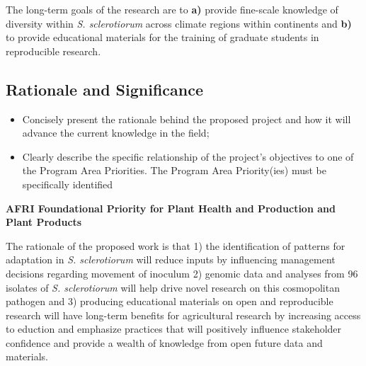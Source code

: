 \documentclass[12pt,letterpaper]{article}
\begin{document}
The long-term goals of the research are to \textbf{a)} provide fine-scale knowledge of diversity within \textit{S. sclerotiorum} across climate regions within continents and \textbf{b)} to provide educational materials for the training of graduate students in reproducible research. 

\subsection{Rationale and Significance}


\begin{itemize}
  \item Concisely present the rationale behind the proposed project and how it will
  advance the current knowledge in the field;

  \item Clearly describe the specific relationship of the project's objectives to
  one of the Program Area Priorities. The Program Area Priority(ies) must be
  specifically identified
\end{itemize}



\textbf{AFRI Foundational Priority for Plant Health and Production and Plant Products}

The rationale of the proposed work is that 1) the identification of patterns for adaptation in \textit{S. sclerotiorum} will reduce inputs by influencing management decisions regarding movement of inoculum 2) genomic data and analyses from 96 isolates of \textit{S. sclerotiorum} will help drive novel research on this cosmopolitan pathogen and 3) producing educational materials on open and reproducible research will have long-term benefits for agricultural research by increasing access to eduction and emphasize practices that will positively influence stakeholder confidence and provide a wealth of knowledge from open future data and materials. 
\end{document}
